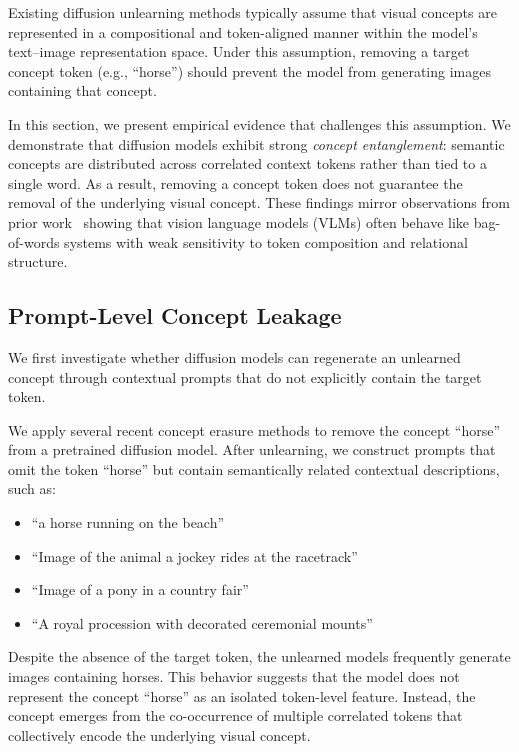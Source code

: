 Existing diffusion unlearning methods typically assume that visual concepts are represented in a compositional and token-aligned manner within the model's text--image representation space. Under this assumption, removing a target concept token (e.g., ``horse'') should prevent the model from generating images containing that concept. 

In this section, we present empirical evidence that challenges this assumption. We demonstrate that diffusion models exhibit strong \textit{concept entanglement}: semantic concepts are distributed across correlated context tokens rather than tied to a single word. As a result, removing a concept token does not guarantee the removal of the underlying visual concept. These findings mirror observations from prior work~\cite{yuksekgonul2022and} showing that vision language models (VLMs) often behave like bag-of-words systems with weak sensitivity to token composition and relational structure.

\subsection{Prompt-Level Concept Leakage}

We first investigate whether diffusion models can regenerate an unlearned concept through contextual prompts that do not explicitly contain the target token.

We apply several recent concept erasure methods to remove the concept ``horse'' from a pretrained diffusion model. After unlearning, we construct prompts that omit the token ``horse'' but contain semantically related contextual descriptions, such as:

\begin{itemize}
\item ``a horse running on the beach''
\item ``Image of the animal a jockey rides at the racetrack''
\item ``Image of a pony in a country fair''
\item ``A royal procession with decorated ceremonial mounts''
\end{itemize}

Despite the absence of the target token, the unlearned models frequently generate images containing horses. This behavior suggests that the model does not represent the concept ``horse'' as an isolated token-level feature. Instead, the concept emerges from the co-occurrence of multiple correlated tokens that collectively encode the underlying visual concept.

